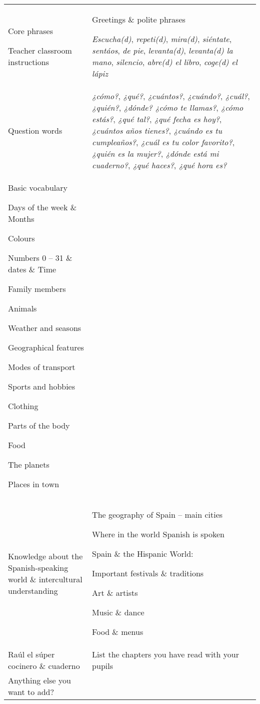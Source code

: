 \documentclass[output=paper]{langscibook}
\begin{document}
\begin{longtable}{ *2{p{}} }
Core phrases

Teacher classroom instructions & Greetings \& polite phrases

\textit{Escucha(d)}, \textit{repeti(d)}, \textit{mira(d)}, \textit{siéntate}, \textit{sentáos}, \textit{de pie}, \textit{levanta(d)}, \textit{levanta(d) la mano}, \textit{silencio}, \textit{abre(d) el libro}, \textit{coge(d) el lápiz}\\

Question words & \textit{¿cómo?}, \textit{¿qué?}, \textit{¿cuántos?}, \textit{¿cuándo?}, \textit{¿cuál?}, \textit{¿quién?}, \textit{¿dónde?  ¿cómo te llamas?}, \textit{¿cómo estás?}, \textit{¿qué tal?}, \textit{¿qué fecha es hoy?}, \textit{¿cuántos años tienes?}, \textit{¿cuándo es tu cumpleaños?}, \textit{¿cuál es tu color favorito?}, \textit{¿quién es la mujer?}, \textit{¿dónde está mi cuaderno?}, \textit{¿qué haces?}, \textit{¿qué hora es?}\\

Basic vocabulary

Days of the week \& Months

Colours

Numbers 0 -- 31 \& dates \& Time

Family members

Animals

Weather and seasons

Geographical features

Modes of transport

Sports and hobbies

Clothing

Parts of the body

Food

The planets

Places in town & \\	
\tablevspace
Knowledge about the Spanish-speaking world \& intercultural understanding	& The geography of Spain -- main cities

Where in the world Spanish is spoken

Spain \& the Hispanic World:

Important festivals \& traditions

Art \& artists

Music \& dance

Food \& menus\\
\tablevspace
Raúl el súper cocinero \& cuaderno & List the chapters you have read with your pupils\\
\tablevspace
Anything else you want to add? & \\

\end{longtable}

\printbibliography[heading=subbibliography,notkeyword=this]
\end{document}

